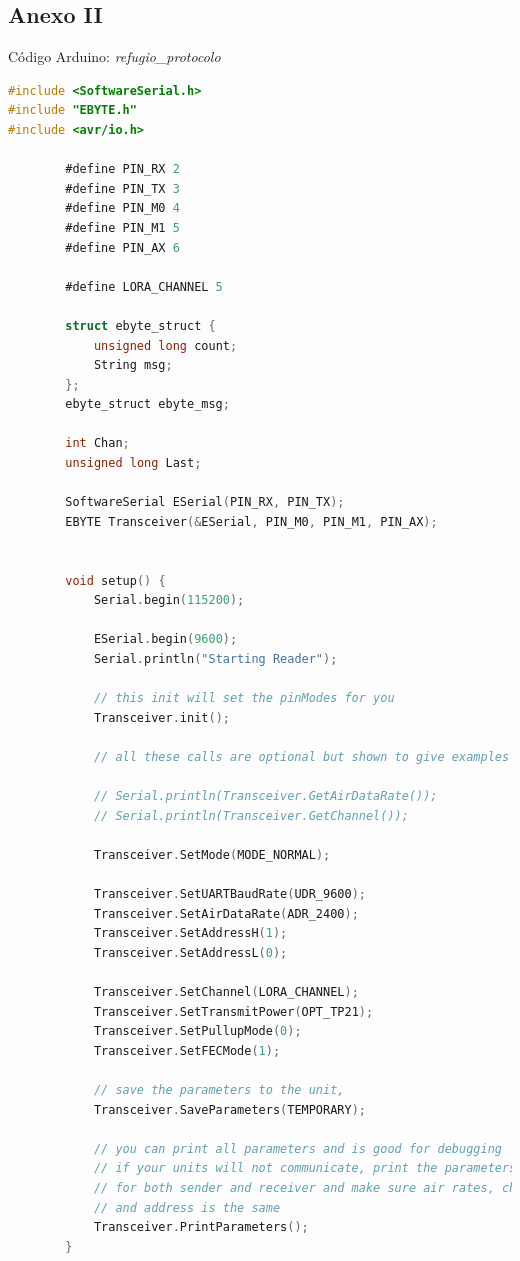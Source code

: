 \documentclass[12pt]{article}
\begin{document}
	\pagebreak
	
	\subsection*{Anexo II}
	\label{anexo II: codigo}
	
	\noindent Código Arduino: \textit{refugio\_protocolo} \\
	
	\begin{lstlisting}[language=C]
#include <SoftwareSerial.h>
#include "EBYTE.h"
#include <avr/io.h>
		
		#define PIN_RX 2
		#define PIN_TX 3
		#define PIN_M0 4
		#define PIN_M1 5
		#define PIN_AX 6
		
		#define LORA_CHANNEL 5
		
		struct ebyte_struct {
			unsigned long count;
			String msg;                                           
		};
		ebyte_struct ebyte_msg;
		
		int Chan;
		unsigned long Last;
		
		SoftwareSerial ESerial(PIN_RX, PIN_TX);
		EBYTE Transceiver(&ESerial, PIN_M0, PIN_M1, PIN_AX);
		
		
		void setup() {
			Serial.begin(115200);
			
			ESerial.begin(9600);
			Serial.println("Starting Reader");
			
			// this init will set the pinModes for you
			Transceiver.init();
			
			// all these calls are optional but shown to give examples of what you can do
			
			// Serial.println(Transceiver.GetAirDataRate());
			// Serial.println(Transceiver.GetChannel());
			
			Transceiver.SetMode(MODE_NORMAL);
			
			Transceiver.SetUARTBaudRate(UDR_9600);
			Transceiver.SetAirDataRate(ADR_2400);
			Transceiver.SetAddressH(1);
			Transceiver.SetAddressL(0);
			
			Transceiver.SetChannel(LORA_CHANNEL);
			Transceiver.SetTransmitPower(OPT_TP21);
			Transceiver.SetPullupMode(0);
			Transceiver.SetFECMode(1);
			
			// save the parameters to the unit,
			Transceiver.SaveParameters(TEMPORARY);
			
			// you can print all parameters and is good for debugging
			// if your units will not communicate, print the parameters
			// for both sender and receiver and make sure air rates, channel
			// and address is the same
			Transceiver.PrintParameters();
		}
		

\end{lstlisting}
\end{document}
